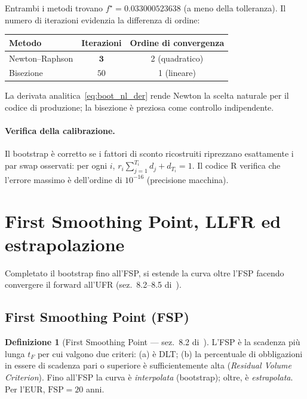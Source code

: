 \documentclass[11pt,a4paper]{article}
\theoremstyle{plain}
\theoremstyle{definition}
\newtheorem{definizione}[teorema]{Definizione}
\theoremstyle{remark}
\newcommand{\FSP}{\mathrm{FSP}}
\begin{document}
\begin{keybox}
Entrambi i metodi trovano $f^\star = 0.033000523638$ (a meno della tolleranza). Il
numero di iterazioni evidenzia la differenza di ordine:
\begin{center}\small
\renewcommand{\arraystretch}{1.2}
\begin{tabular}{lcc}
\toprule
\textbf{Metodo} & \textbf{Iterazioni} & \textbf{Ordine di convergenza}\\
\midrule
Newton--Raphson & $\mathbf{3}$  & 2 (quadratico)\\
Bisezione       & $50$          & 1 (lineare)\\
\bottomrule
\end{tabular}
\end{center}
La derivata analitica~\eqref{eq:boot_nl_der} rende Newton la scelta naturale per il
codice di produzione; la bisezione \`e preziosa come controllo indipendente.
\end{keybox}

\paragraph{Verifica della calibrazione.}
Il bootstrap \`e corretto se i fattori di sconto ricostruiti riprezzano esattamente i
par swap osservati: per ogni $i$, $r_i \sum_{j=1}^{T_i} d_j + d_{T_i} = 1$. Il codice R
verifica che l'errore massimo \`e dell'ordine di $10^{-16}$ (precisione macchina).

\section{First Smoothing Point, LLFR ed estrapolazione}
\label{sec:estrapolazione}

Completato il bootstrap fino all'FSP, si estende la curva oltre l'FSP facendo
convergere il forward all'UFR (sez.~8.2--8.5 di~\cite{eiopa2026}).

\subsection{First Smoothing Point (FSP)}

\begin{definizione}[First Smoothing Point --- sez.~8.2 di~\cite{eiopa2026}]
L'FSP \`e la scadenza pi\`u lunga $t_F$ per cui valgono due criteri: (a) \`e DLT; (b) la
percentuale di obbligazioni in essere di scadenza pari o superiore \`e sufficientemente
alta (\emph{Residual Volume Criterion}). Fino all'FSP la curva \`e \emph{interpolata}
(bootstrap); oltre, \`e \emph{estrapolata}. Per l'EUR, $\FSP = 20$ anni.
\end{definizione}
\end{document}
